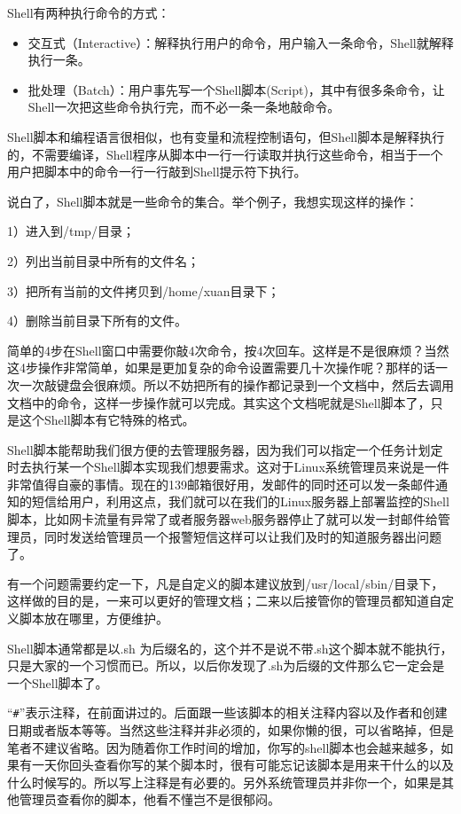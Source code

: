 Shell有两种执行命令的方式：
\begin{itemize}
\item 交互式（Interactive）：解释执行用户的命令，用户输入一条命令，Shell就解释执行一条。
\item 批处理（Batch）：用户事先写一个Shell脚本(Script)，其中有很多条命令，让Shell一次把这些命令执行完，而不必一条一条地敲命令。
\end{itemize}

Shell脚本和编程语言很相似，也有变量和流程控制语句，但Shell脚本是解释执行的，不需要编译，Shell程序从脚本中一行一行读取并执行这些命令，相当于一个用户把脚本中的命令一行一行敲到Shell提示符下执行。


说白了，Shell脚本就是一些命令的集合。举个例子，我想实现这样的操作：

1）进入到/tmp/目录；

2）列出当前目录中所有的文件名；

3）把所有当前的文件拷贝到/home/xuan目录下；

4）删除当前目录下所有的文件。

简单的4步在Shell窗口中需要你敲4次命令，按4次回车。这样是不是很麻烦？当然这4步操作非常简单，如果是更加复杂的命令设置需要几十次操作呢？那样的话一次一次敲键盘会很麻烦。所以不妨把所有的操作都记录到一个文档中，然后去调用文档中的命令，这样一步操作就可以完成。其实这个文档呢就是Shell脚本了，只是这个Shell脚本有它特殊的格式。

Shell脚本能帮助我们很方便的去管理服务器，因为我们可以指定一个任务计划定时去执行某一个Shell脚本实现我们想要需求。这对于Linux系统管理员来说是一件非常值得自豪的事情。现在的139邮箱很好用，发邮件的同时还可以发一条邮件通知的短信给用户，利用这点，我们就可以在我们的Linux服务器上部署监控的Shell脚本，比如网卡流量有异常了或者服务器web服务器停止了就可以发一封邮件给管理员，同时发送给管理员一个报警短信这样可以让我们及时的知道服务器出问题了。

有一个问题需要约定一下，凡是自定义的脚本建议放到/usr/local/sbin/目录下，这样做的目的是，一来可以更好的管理文档；二来以后接管你的管理员都知道自定义脚本放在哪里，方便维护。

Shell脚本通常都是以.sh 为后缀名的，这个并不是说不带.sh这个脚本就不能执行，只是大家的一个习惯而已。所以，以后你发现了.sh为后缀的文件那么它一定会是一个Shell脚本了。

“\verb|#|”表示注释，在前面讲过的。后面跟一些该脚本的相关注释内容以及作者和创建日期或者版本等等。当然这些注释并非必须的，如果你懒的很，可以省略掉，但是笔者不建议省略。因为随着你工作时间的增加，你写的shell脚本也会越来越多，如果有一天你回头查看你写的某个脚本时，很有可能忘记该脚本是用来干什么的以及什么时候写的。所以写上注释是有必要的。另外系统管理员并非你一个，如果是其他管理员查看你的脚本，他看不懂岂不是很郁闷。

